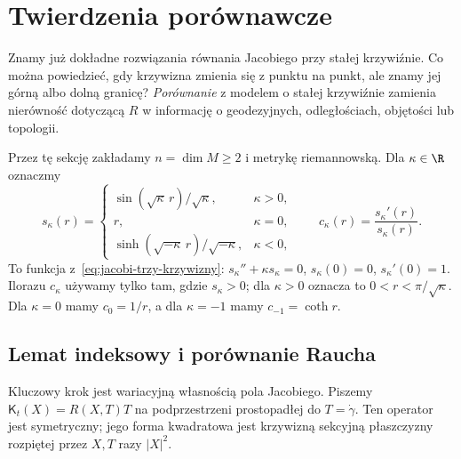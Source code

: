 \section{Twierdzenia porównawcze}
\label{sec:twierdzenia-porownawcze}

Znamy już dokładne rozwiązania równania Jacobiego
przy stałej krzywiźnie. Co można powiedzieć, gdy
krzywizna zmienia się z punktu na punkt, ale znamy
jej górną albo dolną granicę? \emph{Porównanie}
z modelem o stałej krzywiźnie zamienia nierówność
dotyczącą $R$ w informację o geodezyjnych,
odległościach, objętości lub topologii.

Przez tę sekcję zakładamy $n=\dim M\geq2$
i metrykę riemannowską. Dla $\kappa\in\R$
oznaczmy
\begin{equation}\label{eq:porownanie-s-kappa}
 s_\kappa(r)=
 \begin{cases}
  \sin(\sqrt\kappa\,r)/\sqrt\kappa,&\kappa>0,\\
  r,&\kappa=0,\\
  \sinh(\sqrt{-\kappa}\,r)/\sqrt{-\kappa},&\kappa<0,
 \end{cases}
 \qquad c_\kappa(r)=\frac{s_\kappa'(r)}{s_\kappa(r)}.
\end{equation}
To funkcja z~\eqref{eq:jacobi-trzy-krzywizny}:
$s_\kappa''+\kappa s_\kappa=0$,
$s_\kappa(0)=0$, $s_\kappa'(0)=1$.
Ilorazu $c_\kappa$ używamy tylko tam, gdzie
$s_\kappa>0$; dla $\kappa>0$ oznacza to
$0<r<\pi/\sqrt\kappa$. Dla $\kappa=0$
mamy $c_0=1/r$, a dla $\kappa=-1$
mamy $c_{-1}=\coth r$.

\subsection*{Lemat indeksowy i porównanie Raucha}

Kluczowy krok jest wariacyjną własnością pola
Jacobiego. Piszemy $\mathsf K_t(X)=R(X,T)T$
na podprzestrzeni prostopadłej do $T=\dot\gamma$.
Ten operator jest symetryczny; jego forma
kwadratowa jest krzywizną sekcyjną płaszczyzny
rozpiętej przez $X,T$ razy $|X|^2$.

